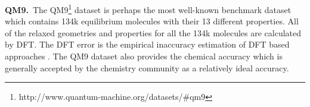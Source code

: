 \documentclass[letterpaper]{article} \usepackage{bm}
\begin{document}
\textbf{QM9.}\ The QM9\footnote{http://www.quantum-machine.org/datasets/\#qm9} dataset \cite{ramakrishnan2014quantum} is perhaps the most well-known benchmark dataset which contains  134k equilibrium molecules with their 13 different properties. All of the relaxed geometries and properties for all the 134k molecules are calculated by DFT. The DFT error is the empirical inaccuracy estimation of DFT based approaches \cite{faber2017prediction}. The QM9 dataset also provides the chemical accuracy which is generally accepted by the chemistry community as a relatively ideal accuracy. 

\begin{table*}[tbp]
\centering
\footnotesize


\caption{Predictive accuracy of different models in QM9}
\begin{threeparttable}
\end{threeparttable}
\end{table*}
\end{document}
